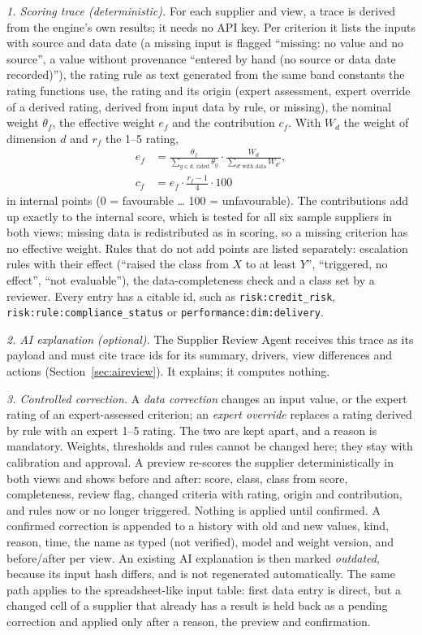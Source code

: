 \documentclass[10pt,twocolumn,a4paper]{article}
\newcommand{\code}[1]{{\small\texttt{#1}}}
\begin{document}
\emph{1. Scoring trace (deterministic).} For each supplier and view, a trace is derived from
the engine's own results; it needs no API key. Per criterion it lists the inputs with source and
data date (a missing input is flagged ``missing: no value and no source'', a value without
provenance ``entered by hand (no source or data date recorded)''), the rating rule as text
generated from the same band constants the rating functions use, the rating and its origin
(expert assessment, expert override of a derived rating, derived from input data by rule, or
missing), the nominal weight $\theta_f$, the effective weight $e_f$ and the contribution $c_f$.
With $W_d$ the weight of dimension $d$ and $r_f$ the 1--5 rating,
\begin{align*}
  e_f &= \frac{\theta_f}{\sum_{g\in d,\ \text{rated}}\theta_g}\cdot
         \frac{W_d}{\sum_{d'\ \text{with data}} W_{d'}},\\
  c_f &= e_f\cdot\frac{r_f-1}{4}\cdot 100
\end{align*}
in internal points (0 = favourable \ldots{} 100 = unfavourable). The contributions add up
exactly to the internal score, which is tested for all six sample suppliers in both views;
missing data is redistributed as in scoring, so a missing criterion has no effective weight.
Rules that do not add points are listed separately: escalation rules with their effect
(``raised the class from $X$ to at least $Y$'', ``triggered, no effect'', ``not evaluable''),
the data-completeness check and a class set by a reviewer. Every entry has a citable id, such
as \code{risk:credit\_risk}, \code{risk:rule:compliance\_status} or
\code{performance:dim:delivery}.

\emph{2. AI explanation (optional).} The Supplier Review Agent receives this trace as its payload
and must cite trace ids for its summary, drivers, view differences and actions
(Section~\ref{sec:aireview}). It explains; it computes nothing.

\emph{3. Controlled correction.} A \emph{data correction} changes an input value, or the
expert rating of an expert-assessed criterion; an \emph{expert override} replaces a rating
derived by rule with an expert 1--5 rating. The two are kept apart, and a reason is mandatory.
Weights, thresholds and rules cannot be changed here; they stay with calibration and approval.
A preview re-scores the supplier deterministically in both views and shows before and after:
score, class, class from score, completeness, review flag, changed criteria with rating, origin
and contribution, and rules now or no longer triggered. Nothing is applied until confirmed. A
confirmed correction is appended to a history with old and new values, kind, reason, time, the
name as typed (not verified), model and weight version, and before/after per view. An existing
AI explanation is then marked \emph{outdated}, because its input hash differs, and is not
regenerated automatically. The same path applies to the spreadsheet-like input table: first data
entry is direct, but a changed cell of a supplier that already has a result is held back as a
pending correction and applied only after a reason, the preview and confirmation.
\end{document}
